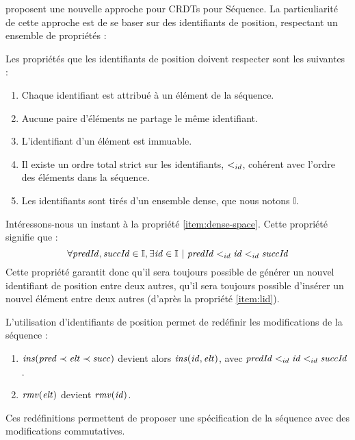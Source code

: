 \cite{2007-crdt-shapiro, 2009-treedoc-preguica} proposent une nouvelle approche pour CRDTs pour Séquence.
La particuliarité de cette approche est de se baser sur des identifiants de position, respectant un ensemble de propriétés :
\begin{definition}
  \label{def:dense-ids}
  Les propriétés que les identifiants de position doivent respecter sont les suivantes :
  \begin{enumerate}
    \item Chaque identifiant est attribué à un élément de la séquence.
    \item \label{item:uniqueness}
      Aucune paire d'éléments ne partage le même identifiant.
    \item L'identifiant d'un élément est immuable.
    \item \label{item:lid}
      Il existe un ordre total strict sur les identifiants, $<_{id}$, cohérent avec l'ordre des éléments dans la séquence.
    \item \label{item:dense-space}
      Les identifiants sont tirés d'un ensemble dense, que nous notons $\mathbb{I}$.
  \end{enumerate}
\end{definition}

Intéressons-nous un instant à la propriété \ref{item:dense-space}.
Cette propriété signifie que :
\begin{equation*}
  \forall \mathit{predId}, \mathit{succId} \in \mathbb{I}, \exists \mathit{id} \in \mathbb{I}~|~\mathit{predId} <_{id} \mathit{id} <_{id} \mathit{succId}
\end{equation*}
Cette propriété garantit donc qu'il sera toujours possible de générer un nouvel identifiant de position entre deux autres, \ie qu'il sera toujours possible d'insérer un nouvel élément entre deux autres (d'après la propriété \ref{item:lid}).

L'utilisation d'identifiants de position permet de redéfinir les modifications de la séquence :
\begin{enumerate}
  \item $\mathit{ins}(\mathit{pred} \prec \mathit{elt} \prec \mathit{succ})$ devient alors $\mathit{ins}(\mathit{id}, \mathit{elt})$, avec $\mathit{predId} <_{id} \mathit{id} <_{id} \mathit{succId}$.
  \item $\mathit{rmv}(\mathit{elt})$ devient $\mathit{rmv}(\mathit{id})$.
\end{enumerate}
Ces redéfinitions permettent de proposer une spécification de la séquence avec des modifications commutatives.

